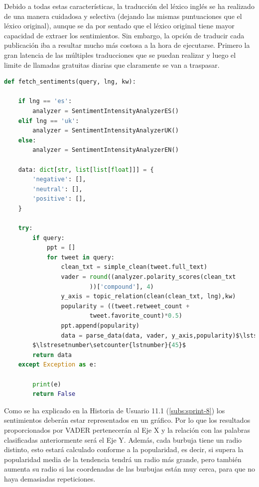 \vspace{0.3cm}

Debido a todas estas características, la traducción del léxico inglés se ha realizado de una manera cuidadosa y selectiva (dejando las mismas puntuaciones que el léxico original), aunque se da por sentado que el léxico original tiene mayor capacidad de extraer los sentimientos. Sin embargo, la opción de traducir cada publicación iba a resultar mucho más costosa a la hora de ejecutarse. Primero la gran latencia de las múltiples traducciones que se puedan realizar y luego el limite de llamadas gratuitas diarias que claramente se van a traspasar.

\makeatletter
\let\orig@lstnumber=\thelstnumber

\newcommand\lstsetnumber[1]{\gdef\thelstnumber{#1}}
\newcommand\lstresetnumber{\global\let\thelstnumber=\orig@lstnumber}
\makeatother

\vspace{0.3cm}

\begin{lstlisting}[caption=Extracción de los sentimientos,          label={lst:listing-python},language=Python, mathescape=true]
def fetch_sentiments(query, lng, kw):

    if lng == 'es':
        analyzer = SentimentIntensityAnalyzerES()
    elif lng == 'uk':
        analyzer = SentimentIntensityAnalyzerUK()
    else:
        analyzer = SentimentIntensityAnalyzerEN()

    data: dict[str, list[list[float]]] = {
        'negative': [],
        'neutral': [],
        'positive': [],
    }

    try:
        if query:
            ppt = []
            for tweet in query:
                clean_txt = simple_clean(tweet.full_text)
                vader = round((analyzer.polarity_scores(clean_txt
                        ))['compound'], 4)
                y_axis = topic_relation(clean(clean_txt, lng),kw)
                popularity = ((tweet.retweet_count + 
                        tweet.favorite_count)*0.5)
                ppt.append(popularity)
                data = parse_data(data, vader, y_axis,popularity)$\lstsetnumber{\ldots}$
        $\lstresetnumber\setcounter{lstnumber}{45}$ 
        return data
    except Exception as e:

        print(e)
        return False
\end{lstlisting}

Como se ha explicado en la Historia de Usuario 11.1 (\ref{subs:sprint-8}) los sentimientos deberán estar representados en un gráfico. Por lo que los resultados proporcionados por \ac{VADER} pertenecerán al Eje X y la relación con las palabras clasificadas anteriormente será el Eje Y. Además, cada burbuja tiene un radio distinto, esto estará calculado conforme a la popularidad, es decir, si supera la popularidad media de la tendencia tendrá un radio más grande, pero también aumenta su radio si las coordenadas de las burbujas están muy cerca, para que no haya demasiadas repeticiones.

